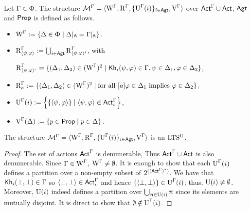 \medskip

\begin{definition}\label{def:cm-ults-khiml}
Let $\Gamma \in \Upphi$. The structure $\mathcal{M}^\Gamma=\langle \operatorname{W}^\Gamma, \operatorname{R}^\Gamma, \{ \operatorname{U}^\Gamma(i) \}_{i \in {\rm \sf Agt}}, \operatorname{V}^\Gamma \rangle$ over ${\rm \sf Act}^\Gamma \cup {\rm \sf Act}$, ${\rm \sf Agt}$ and ${\rm \sf Prop}$ is defined as follows.
\begin{itemize}
\item $\operatorname{W}^\Gamma := \{ \Delta \in \Upphi \mid \Delta\vert_{{\sf A}} = \Gamma\vert_{{\sf A}} \}$.

\item $\operatorname{R}^{\Gamma}_{\langle \psi,\varphi \rangle} := \bigcup_{i \in {\rm \sf Agt}} \operatorname{R}^{\Gamma} _{\langle \psi,\varphi \rangle^i}$, with
\begin{center}
$\operatorname{R}^{\Gamma}_{\langle \psi,\varphi \rangle^i} = \{ (\Delta_1, \Delta_2) \in (\operatorname{W}^\Gamma)^2 \mid {\sf Kh}_i(\psi,\varphi) \in \Gamma, \psi \in \Delta_1, \varphi \in \Delta_2 \}$,
\end{center}

\item $\operatorname{R}^{\Gamma}_a := \{ (\Delta_1, \Delta_2) \in (\operatorname{W}^\Gamma)^2 \mid \text{for all } [a]\varphi \in \Delta_1 \text{ implies } \varphi \in \Delta_2 \}$,

\item $\operatorname{U}^\Gamma(i) := \left\{ \{ \langle \psi,\varphi \rangle \} \mid \langle \psi,\varphi \rangle \in {\rm \sf Act}^\Gamma_i \right\}$,

\item $\operatorname{V}^\Gamma(\Delta) := \{ p \in {\rm \sf Prop} \mid p \in \Delta \}$.
\end{itemize}
\end{definition}

\medskip

\begin{proposition}\label{pro:cm-ults-khiml}
The structure $\mathcal{M}^\Gamma = \langle \operatorname{W}^\Gamma, \operatorname{R}^\Gamma, \{ \operatorname{U}^\Gamma(i) \}_{i \in {\rm \sf Agt}}, \operatorname{V}^\Gamma \rangle$ is an $\textup{LTS$^\text{\textup{U}}$}$.
\end{proposition}
\begin{proof}
The set of actions ${\rm \sf Act}^\Gamma$ is denumerable, Thus ${\rm \sf Act}^\Gamma\cup{\rm \sf Act}$ is also denumerable.
Since $\Gamma \in \operatorname{W}^\Gamma$, $\operatorname{W}^\Gamma \neq \emptyset$.
It is enough to show that each $\operatorname{U}^\Gamma(i)$ defines a partition over a non-empty subset of $2^{(({\rm \sf Act}^\Gamma)^*)}$.
We have that ${\sf Kh}_i(\bot,\bot) \in \Gamma$ so $\langle \bot, \bot \rangle \in {\rm \sf Act}^\Gamma_i$ and hence $\{ \langle \bot, \bot \rangle \} \in \operatorname{U}^\Gamma(i)$; thus, $\operatorname{U}(i) \neq \emptyset$.
Moreover, $\operatorname{U}(i)$ indeed defines a partition over $\bigcup_{\uppi \in \operatorname{U}(i)} \uppi$ since its elements are mutually disjoint.
It is direct to show that $\emptyset \notin \operatorname{U}^\Gamma(i)$.
\end{proof}

